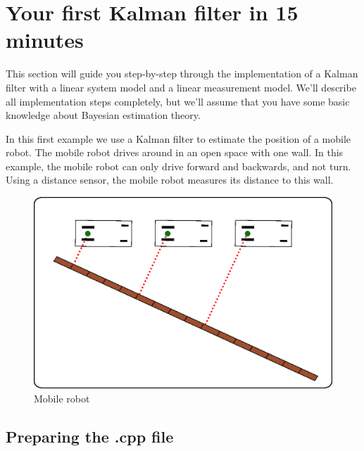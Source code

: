 \documentclass[a4paper,10pt]{report}
\begin{document}
\pagebreak
\section{Your first Kalman filter in 15 minutes}
This section will guide you step-by-step through the implementation of
a Kalman filter with a linear system model and a linear measurement
model. We'll describe all implementation steps completely, but we'll
assume that you have some basic knowledge about Bayesian estimation
theory.

In this first example we use a Kalman filter to estimate the position
of a mobile robot. The mobile robot drives around in an open space
with one wall. In this example, the mobile robot can only drive
forward and backwards, and not turn. Using a distance sensor, the
mobile robot measures its distance to this wall.

\begin{figure}
\center
\includegraphics[width=12cm]{mobile_robot_simple.eps}
\caption{Mobile robot}
\label{fig: mobile_robot}
\end{figure}




\subsection{Preparing the .cpp file}
\end{document}
